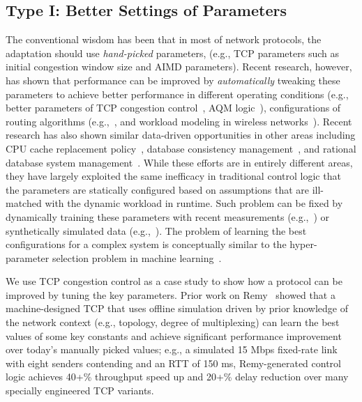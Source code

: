 \subsection{Type I: Better Settings of Parameters}
\label{subsec:related:data:type1}

The conventional wisdom has been that in most of network protocols, 
the adaptation should use {\em hand-picked} parameters, (e.g., TCP parameters 
such as initial congestion window size and AIMD parameters).
Recent research, however, has shown that performance
can be improved by {\em automatically} tweaking these parameters 
to achieve better performance in different operating conditions
(e.g., better parameters of TCP congestion control~\cite{remy,googleinitwindow}, 
AQM logic~\cite{shah2016sam,lin2015kemy}), configurations of routing algorithms 
(e.g.,~\cite{sharma2017machine}, and workload modeling in wireless 
networks~\cite{alsheikh2014machine}).
Recent research has also shown similar data-driven opportunities 
in other areas including CPU cache replacement policy~\cite{calvinlin-cache},
database consistency management~\cite{aaron-cidr}, and 
rational database system management~\cite{andypavlo-rbsm}.
While these efforts are in entirely different areas, they have largely 
exploited the same inefficacy in traditional
control logic that the parameters are statically configured 
based on assumptions that are ill-matched with the dynamic workload 
in runtime.  
Such problem can be fixed by dynamically training
these parameters with recent measurements
(e.g.,~\cite{calvinlin-cache}) or synthetically simulated data (e.g.,~\cite{remy}).
The problem of learning the best configurations
for a complex system is conceptually similar to the 
hyper-parameter selection problem in machine learning~\cite{ml101}.

\noindent\underline{}
We use TCP congestion control as a case study to show
how a protocol can be improved by tuning the key parameters.
Prior work on Remy~\cite{remy} showed that a machine-designed 
TCP that uses offline simulation driven by prior  knowledge of the 
network context (e.g., topology, degree of multiplexing) can learn 
the best values of some key constants and achieve significant 
performance improvement over today's manually picked values; 
e.g., a simulated 15 Mbps fixed-rate link with eight senders 
contending and an RTT of 150 ms, Remy-generated control logic achieves 
40+\% throughput speed up and 20+\% delay reduction over many 
specially engineered TCP variants.


